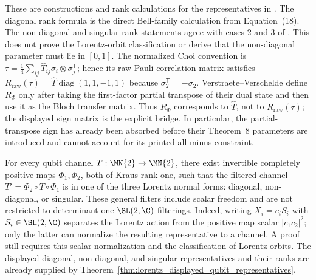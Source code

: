 \begin{theorem}
    These are constructions and rank calculations for the representatives in
    \cite[Theorem~8, Eqs.~(17)--(19)]{VerstraeteVerschelde2002QuantumChannels}.
    The diagonal rank formula is the direct Bell-family calculation from
    Equation~(18).  The non-diagonal and singular rank statements agree with
    cases 2 and 3 of \cite[Theorem~18]{WolfCirac2008Dividing}.  This does not
    prove the Lorentz-orbit classification or derive that the non-diagonal
    parameter must lie in $[0,1]$.
    The normalized Choi convention is
    $\tau=\frac14\sum_{ij}\widehat T_{ij}\sigma_i\otimes\sigma_j^{\mathsf T}$;
    hence its raw Pauli correlation matrix satisfies
    $R_{\mathrm{raw}}(\tau)=\widehat T\operatorname{diag}(1,1,-1,1)$ because
    $\sigma_2^{\mathsf T}=-\sigma_2$.  Verstraete--Verschelde define $R_\Phi$
    only after taking the first-factor partial transpose of their dual state
    and then use it as the Bloch transfer matrix.  Thus $R_\Phi$ corresponds
    to $\widehat T$, not to $R_{\mathrm{raw}}(\tau)$; the displayed sign matrix
    is the explicit bridge.  In particular, the partial-transpose sign has
    already been absorbed before their Theorem~8 parameters are introduced and
    cannot account for its printed all-minus constraint.
\end{theorem}

\begin{theorem}\label{thm:lorentz_normal_form_qubit}
    For every qubit channel $T : \MN{2} \to \MN{2}$, there exist invertible
    completely positive maps $\Phi_{1},\Phi_{2}$, both of Kraus rank one, such
    that the filtered channel $T'=\Phi_{2}\circ T\circ\Phi_{1}$ is in one
    of the three Lorentz normal forms: diagonal, non-diagonal, or singular.
    These general filters include scalar freedom and are not restricted to
    determinant-one $\SL(2,\C)$ filterings. Indeed, writing $X_i=c_iS_i$
    with $S_i\in\SL(2,\C)$ separates the Lorentz action from the positive
    map scalar $|c_1c_2|^2$; only the latter can normalize the resulting
    representative to a channel. A proof still requires this scalar
    normalization and the classification of Lorentz orbits.  The displayed
    diagonal, non-diagonal, and singular representatives and their ranks are already
    supplied by Theorem~\ref{thm:lorentz_displayed_qubit_representatives}.
\end{theorem}

